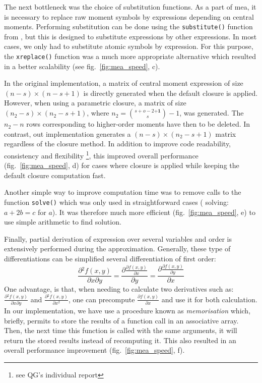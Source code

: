 The next bottleneck was the choice of substitution functions.
As a part of \gls{mea}, it is necessary to replace raw moment symbols by expressions depending on central moments.
Performing substitution can be done using the \texttt{substitute()} function from \sympy, but this is designed to substitute expressions by other expressions.
In most cases, we only had to substitute atomic symbols by expression.
For this purpose, the  \texttt{xreplace()} function was a much more appropriate alternative which resulted in a better scalability (see fig.~\ref{fig:mea_speed}, c).

In the original implementation, a matrix of central moment expression of size $(n-s) \times (n-s + 1)$ is directly generated when the default closure is applied.
However, when using a parametric closure, a matrix of size $(n_2-s) \times (n_2-s + 1)$, where $n_2={{s+o-2 \mathbf{+1}} \choose {s}} -1$, was generated.
The $n_2 - n$ rows corresponding to higher-order moments have then to be deleted.
In contrast, out implementation generates a $(n-s) \times (n_2-s + 1)$ matrix regardless of the closure method.
In addition to improve code readability, consistency and flexibility \footnote{see QG's individual report}, this improved overall performance (fig.~\ref{fig:mea_speed}, d) for cases where closure is applied while keeping the default closure computation fast.

Another simple way to improve computation time was to remove calls to the function \texttt{solve()} which was only used in straightforward cases (\eg{} solving: $a + 2b = c$ for $a$).
It was therefore much more efficient (fig.~\ref{fig:mea_speed}, e) to use simple arithmetic to find solution.

Finally, partial derivation of expression over several variables and order is extensively performed during the approximation.
Generally, these type of differentiations can be simplified several differentiation of first order:
\begin{equation}
\frac{\partial{} ^ 2 f(x,y)}{\partial x \partial y}  =
\frac{\partial{} \frac{\partial{} f(x,y)}{\partial x}}{\partial y} =
\frac{\partial{} \frac{\partial{} f(x,y)}{\partial{} y}}{\partial{} x}
\end{equation}
One advantage, is that, when needing to calculate two derivatives such as:  $\frac{\partial{} ^ 2 f(x,y)}{\partial{} x \partial{} y}$ and $\frac{\partial{} ^ 2 f(x,y)}{\partial{} x^2}$, 
one can precompute $\frac{\partial{} f(x,y)}{\partial{} x}$ and use it for both calculation.
In our implementation, we have use a procedure known as \emph{memorisation} which, briefly, permits to store the results of a function call in an associative array.
Then, the next time this function is called with the same arguments, it will return the stored results instead of recomputing it.
This also resulted in an overall performance improvement (fig.~\ref{fig:mea_speed}, f).

